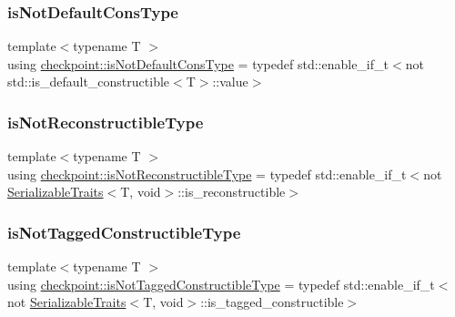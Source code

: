 \mbox{\label{namespacecheckpoint_a4032c86e7c92702198dd675a2696ee2c}} 
\subsubsection{\texorpdfstring{is\+Not\+Default\+Cons\+Type}{isNotDefaultConsType}}
{\footnotesize\ttfamily template$<$typename T $>$ \\
using \hyperlink{namespacecheckpoint_a4032c86e7c92702198dd675a2696ee2c}{checkpoint\+::is\+Not\+Default\+Cons\+Type} = typedef std\+::enable\+\_\+if\+\_\+t$<$not std\+::is\+\_\+default\+\_\+constructible$<$T$>$\+::value$>$}

\mbox{\label{namespacecheckpoint_a0054cbef71b90d6860e1d3916cf9d299}} 
\subsubsection{\texorpdfstring{is\+Not\+Reconstructible\+Type}{isNotReconstructibleType}}
{\footnotesize\ttfamily template$<$typename T $>$ \\
using \hyperlink{namespacecheckpoint_a0054cbef71b90d6860e1d3916cf9d299}{checkpoint\+::is\+Not\+Reconstructible\+Type} = typedef std\+::enable\+\_\+if\+\_\+t$<$not \hyperlink{structcheckpoint_1_1_serializable_traits}{Serializable\+Traits}$<$T, void$>$\+::is\+\_\+reconstructible$>$}

\mbox{\label{namespacecheckpoint_a4eb64ee16bff7ef1609e5b98cb16cfb6}} 
\subsubsection{\texorpdfstring{is\+Not\+Tagged\+Constructible\+Type}{isNotTaggedConstructibleType}}
{\footnotesize\ttfamily template$<$typename T $>$ \\
using \hyperlink{namespacecheckpoint_a4eb64ee16bff7ef1609e5b98cb16cfb6}{checkpoint\+::is\+Not\+Tagged\+Constructible\+Type} = typedef std\+::enable\+\_\+if\+\_\+t$<$not \hyperlink{structcheckpoint_1_1_serializable_traits}{Serializable\+Traits}$<$T, void$>$\+::is\+\_\+tagged\+\_\+constructible$>$}

